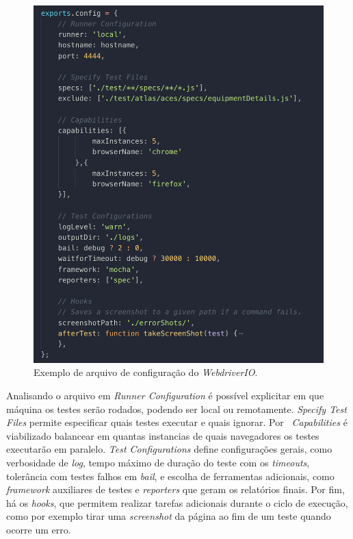 \begin{figure}[H]
    \centering
    \includegraphics[width=13cm]{source/4-solucao/images/webdriverio.png}
    \caption{Exemplo de arquivo de configuração do \emph{WebdriverIO}.}
    \label{fig:webdriverio}
\end{figure}

Analisando o arquivo em \emph{Runner Configuration} é possível explicitar em que máquina os testes serão rodados, podendo ser local ou remotamente. \emph{Specify Test Files} permite especificar quais testes executar e quais ignorar. Por \emph{~Capabilities} é viabilizado balancear em quantas instancias de quais navegadores os testes executarão em paralelo. \emph{Test Configurations} define configurações gerais, como verbosidade de \emph{log}, tempo máximo de duração do teste com os \emph{timeouts}, tolerância com testes falhos em \emph{bail}, e escolha de ferramentas adicionais, como \emph{framework} auxiliares de testes e \emph{reporters} que geram os relatórios finais. Por fim, há os \emph{hooks}, que permitem realizar tarefas adicionais durante o ciclo de execução, como por exemplo tirar uma \emph{screenshot} da página ao fim de um teste quando ocorre um erro.

